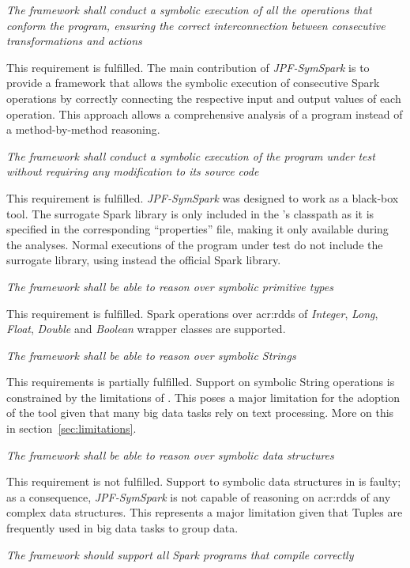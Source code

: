 \begin{itemize}
 \textit{The framework shall conduct a symbolic execution of all the operations that conform the program, ensuring the correct interconnection between consecutive transformations and actions}

This requirement is fulfilled. The main contribution of \textit{JPF-SymSpark} is to provide a framework that allows the symbolic execution of consecutive Spark operations by correctly connecting the respective input and output values of each operation. This approach allows a comprehensive analysis of a program instead of a method-by-method reasoning.

 \textit{The framework shall conduct a symbolic execution of the program under test without requiring any modification to its source code}

This requirement is fulfilled. \textit{JPF-SymSpark} was designed to work as a black-box tool. The surrogate Spark library is only included in the \jpf{}'s classpath as it is specified in the corresponding ``properties'' file, making it only available during the analyses. Normal executions of the program under test do not include the surrogate library, using instead the official Spark library.

 \textit{The framework shall be able to reason over symbolic primitive types}

This requirement is fulfilled. Spark operations over \acrshort{acr:rdd}s of \textit{Integer}, \textit{Long}, \textit{Float}, \textit{Double} and \textit{Boolean} wrapper classes are supported.

 \textit{The framework shall be able to reason over symbolic Strings}

This requirements is partially fulfilled. Support on symbolic String operations is constrained by the limitations of \spf{}. This poses a major limitation for the adoption of the tool given that many big data tasks rely on text processing. More on this in section~\ref{sec:limitations}.

 \textit{The framework shall be able to reason over symbolic data structures}

This requirement is not fulfilled. Support to symbolic data structures in \spf{} is faulty; as a consequence, \textit{JPF-SymSpark} is not capable of reasoning on \acrshort{acr:rdd}s of any complex data structures. This represents a major limitation given that Tuples are frequently used in big data tasks to group data.

 \textit{The framework should support all Spark programs that compile correctly}


\end{itemize}
